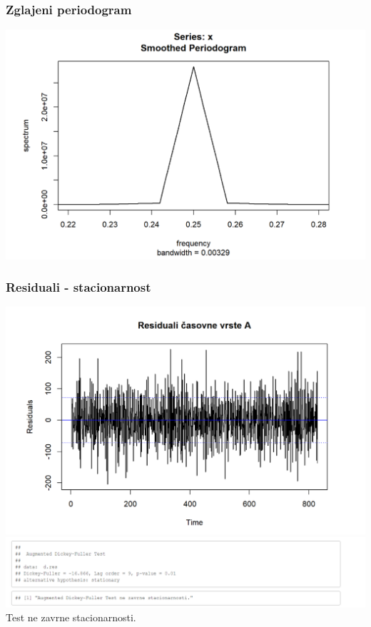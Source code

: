 \documentclass[10pt]{beamer}
\begin{document}
\begin{frame}
\frametitle{Zglajeni periodogram}
\includegraphics[width=1\textwidth]{per_raw2A.png}
\end{frame}

\begin{frame}
\frametitle{Residuali - stacionarnost}
\includegraphics[width=1\textwidth]{res_casA.png}
\includegraphics[width=1\textwidth]{DickyTestA.png}
Test ne zavrne stacionarnosti.
\end{frame}
\end{document}
